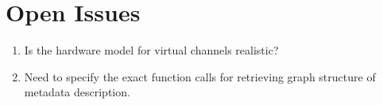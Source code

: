 \section{Open Issues}

\begin{enumerate}

\item Is the hardware model for virtual channels realistic?

\item Need to specify the exact function calls for retrieving graph
structure of metadata description.

\end{enumerate}